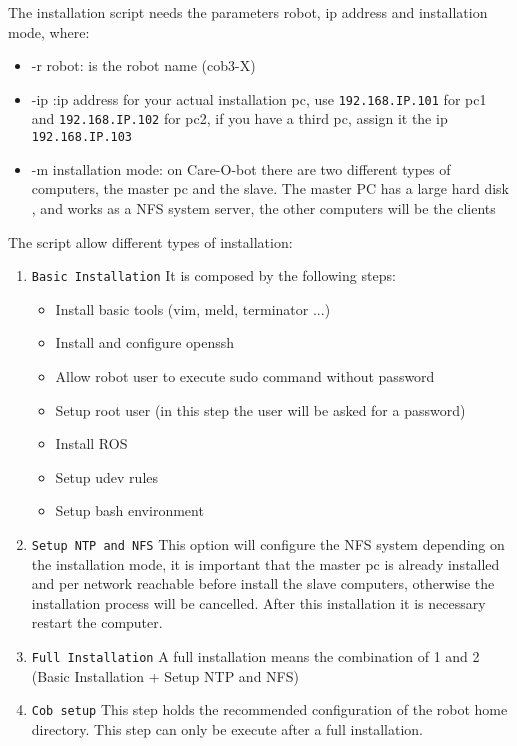 The installation script needs the parameters robot, ip address and installation mode, where:
\begin{itemize}
\item -r robot: is the robot name (cob3-X)
\item -ip :ip address for your actual installation pc, use \texttt{192.168.IP.101} for pc1 and \texttt{192.168.IP.102} for pc2, if you have  a third pc, assign it the ip \texttt{192.168.IP.103}
\item -m installation mode: on Care-O-bot there are two different types of computers, the master pc and the slave. The master PC has a large hard disk , and works as a NFS system server, the other computers will be the clients
\end{itemize}

The script allow different types of installation:

\begin{enumerate}
\item \texttt{Basic Installation} It is composed by the following steps:
\begin{itemize}
\item Install basic tools (vim, meld, terminator ...)
\item Install and configure openssh
\item Allow robot user to execute sudo command without password
\item Setup root user (in this step the user will be asked for a password)
\item Install ROS
\item Setup udev rules
\item Setup bash environment 
\end{itemize}
\item \texttt{Setup NTP and NFS} This option will configure the NFS system depending on the installation mode, it is important that the master pc is already installed and per network reachable before install the slave computers, otherwise the installation process will be cancelled. After this installation it is necessary restart the computer.
\item \texttt{Full Installation} A full installation means the combination of 1 and 2 (Basic Installation + Setup NTP and NFS)
\item \texttt{Cob setup} This step holds the recommended configuration of the robot home directory. This step can only be execute after a full installation.
\end{enumerate}

